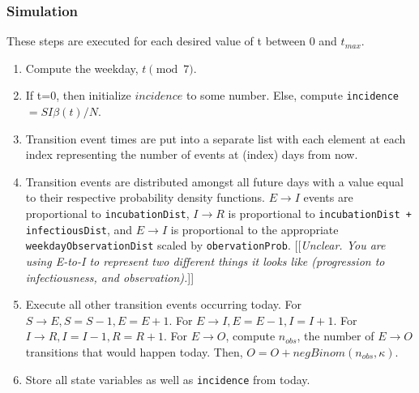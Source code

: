 \documentclass{article}
\newcommand{\code}[1]{\texttt{#1}}
\newcommand{\jd}[1]{[[\textsl{#1}]]}
\begin{document}
\subsubsection{Simulation}
These steps are executed for each desired value of t between 0 and $t_{max}$.
\begin{enumerate}
    
    \item Compute the weekday, $t \pmod 7$.
    
    \item If t=0, then initialize $incidence$ to some number. Else, compute \code{incidence} $= SI\beta(t)/N$.
    
    \item Transition event times are put into a separate list with each element at each index representing the number of events at (index) days from now. 

    \item Transition events are distributed amongst all future days with a value equal to their respective probability density functions. $E \rightarrow I$ events are proportional to \code{incubationDist}, $I \rightarrow R$ is proportional to \code{incubationDist + infectiousDist}, and $E \rightarrow I$ is proportional to the appropriate \linebreak \code{weekdayObservationDist} scaled by \code{obervationProb}.
	 \jd{Unclear. You are using E-to-I to represent two different things it looks like (progression to infectiousness, and observation).}

    \item Execute all other transition events occurring today. For $S \rightarrow E, S=S-1, E=E+1$. For $E \rightarrow I, E=E-1, I=I+1$. For $I \rightarrow R, I = I-1, R = R+1$. For $E \rightarrow O$, compute $n_{obs}$, the number of $E \rightarrow O$ transitions that would happen today. Then, $O = O + negBinom(n_{obs}, \kappa)$.    
    
    \item Store all state variables as well as \code{incidence} from today.
    
\end{enumerate}
\end{document}
